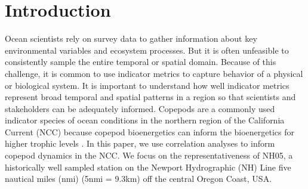 \documentclass[preprint, authoryear, 12pt]{elsarticle}
\begin{document}

\clearpage
\section{Introduction}

Ocean scientists rely on survey data to gather information about key environmental variables and ecosystem processes. But it is often unfeasible to consistently sample the entire temporal or spatial domain. Because of this challenge, it is common to use indicator metrics to capture behavior of a physical or biological system. It is important to understand how well indicator metrics represent broad temporal and spatial patterns in a region so that scientists and stakeholders can be adequately informed. Copepods are a commonly used indicator species of ocean conditions in the northern region of the California Current (NCC) because copepod bioenergetics can inform the bioenergetics for higher trophic levels \citep{peterson2014applied, tucker2015coastal, harvey2020importance}. In this paper, we use correlation analyses to inform copepod dynamics in the NCC. We focus on the representativeness of NH05, a historically well sampled station on the Newport Hydrographic (NH) Line five nautical miles (nmi) (5nmi = 9.3km) off the central Oregon Coast, USA.
\end{document}

